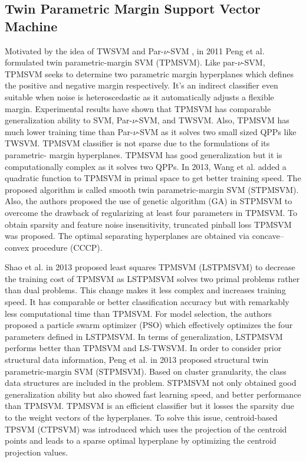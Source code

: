 \documentclass[pdflatex,sn-mathphys]{sn-jnl}%
\theoremstyle{thmstyleone}%
\theoremstyle{thmstyletwo}%
\theoremstyle{thmstylethree}%
\begin{document}
\subsection{Twin Parametric Margin Support Vector Machine}
\noindent
\newline
Motivated by the idea of TWSVM and Par-$\nu$-SVM \cite{hao2010new}, in 2011 Peng et al. \cite{peng2011tpmsvm} formulated twin parametric-margin SVM (TPMSVM). Like par-$\nu$-SVM, TPMSVM seeks to determine two parametric margin hyperplanes which defines the positive and negative margin respectively. It's an indirect classifier even suitable when noise is heteroscedastic as it automatically adjusts a flexible margin. Experimental results have shown that TPMSVM has comparable generalization ability to SVM, Par-$\nu$-SVM, and TWSVM. Also, TPMSVM has much lower training time than Par-$\nu$-SVM as it solves two small sized QPPs like TWSVM. TPMSVM classifier is not sparse due to the formulations of its parametric- margin hyperplanes. TPMSVM has good generalization but it is computationally complex as it solves two QPPs. In 2013, Wang et al. \cite{wang2013ga} added a quadratic function to TPMSVM in primal space to get better training speed. The proposed algorithm is called smooth twin parametric-margin SVM (STPMSVM). Also, the authors proposed the use of genetic algorithm (GA) in STPMSVM to  overcome the drawback of regularizing at least four parameters in TPMSVM.  To obtain sparsity and feature noise insensitivity, truncated pinball loss TPMSVM \cite{wang2021twin} was proposed. The optimal separating hyperplanes are obtained via concave–convex procedure (CCCP).

Shao et al. \cite{shao2013least} in 2013 proposed least squares TPMSVM (LSTPMSVM) to decrease the training cost of TPMSVM as LSTPMSVM solves two primal problems rather than dual problems. This change makes it less complex and increases training speed. It has comparable or better classification accuracy but with remarkably less computational time than TPMSVM. For model selection, the authors proposed a particle swarm optimizer (PSO) which effectively optimizes the four parameters defined in LSTPMSVM. In terms of generalization, LSTPMSVM performs better than TPMSVM and LS-TWSVM. In order to consider prior structural data information, Peng et al. \cite{peng2013structural} in 2013 proposed structural twin parametric-margin SVM (STPMSVM). Based on cluster granularity, the class data structures are included in the problem. STPMSVM not only obtained good generalization ability but also showed fast learning speed, and better performance than TPMSVM. TPMSVM is an efficient classifier but it losses the sparsity due to the weight vectors of the hyperplanes. To solve this issue, centroid-based TPSVM (CTPSVM)  \cite{peng2015improvements} was introduced which uses the projection of the centroid points and leads to a sparse optimal hyperplane by optimizing the centroid projection values.
\end{document}
